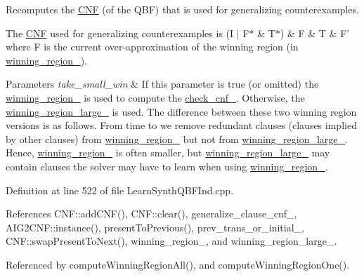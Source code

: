 Recomputes the \hyperlink{classCNF}{C\-N\-F} (of the Q\-B\-F) that is used for generalizing counterexamples. 

The \hyperlink{classCNF}{C\-N\-F} used for generalizing counterexamples is (I $\vert$ F$\ast$ \& T$\ast$) \& F \& T \& F' where F is the current over-\/approximation of the winning region (in \hyperlink{classLearnSynthQBFInd_ab8ce6031137413e90e0626bbdc734be0}{winning\-\_\-region\-\_\-}).


\begin{DoxyParams}{Parameters}
{\em take\-\_\-small\-\_\-win} & If this parameter is true (or omitted) the \hyperlink{classLearnSynthQBFInd_ab8ce6031137413e90e0626bbdc734be0}{winning\-\_\-region\-\_\-} is used to compute the \hyperlink{classLearnSynthQBFInd_ac90a4574da82c96888db219291368554}{check\-\_\-cnf\-\_\-}. Otherwise, the \hyperlink{classLearnSynthQBFInd_a333c9336ba28a2c41f252a3051a59581}{winning\-\_\-region\-\_\-large\-\_\-} is used. The difference between these two winning region versions is as follows. From time to we remove redundant clauses (clauses implied by other clauses) from \hyperlink{classLearnSynthQBFInd_ab8ce6031137413e90e0626bbdc734be0}{winning\-\_\-region\-\_\-} but not from \hyperlink{classLearnSynthQBFInd_a333c9336ba28a2c41f252a3051a59581}{winning\-\_\-region\-\_\-large\-\_\-}. Hence, \hyperlink{classLearnSynthQBFInd_ab8ce6031137413e90e0626bbdc734be0}{winning\-\_\-region\-\_\-} is often smaller, but \hyperlink{classLearnSynthQBFInd_a333c9336ba28a2c41f252a3051a59581}{winning\-\_\-region\-\_\-large\-\_\-} may contain clauses the solver may have to learn when using \hyperlink{classLearnSynthQBFInd_ab8ce6031137413e90e0626bbdc734be0}{winning\-\_\-region\-\_\-}. \\
\hline
\end{DoxyParams}


Definition at line 522 of file Learn\-Synth\-Q\-B\-F\-Ind.\-cpp.



References C\-N\-F\-::add\-C\-N\-F(), C\-N\-F\-::clear(), generalize\-\_\-clause\-\_\-cnf\-\_\-, A\-I\-G2\-C\-N\-F\-::instance(), present\-To\-Previous(), prev\-\_\-trans\-\_\-or\-\_\-initial\-\_\-, C\-N\-F\-::swap\-Present\-To\-Next(), winning\-\_\-region\-\_\-, and winning\-\_\-region\-\_\-large\-\_\-.



Referenced by compute\-Winning\-Region\-All(), and compute\-Winning\-Region\-One().

